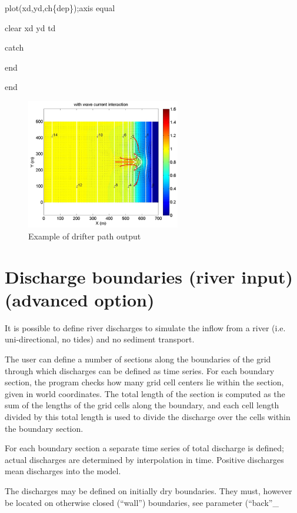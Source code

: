 plot(xd,yd,ch\{dep\});axis equal

clear xd yd td

catch

end

end

\begin{figure}[h]
  \centering
  \includegraphics[width=0.6\textwidth]{image21}
  \caption{Example of drifter path output}
  \label{fig:image21}
\end{figure}

\section{ Discharge boundaries (river input) (advanced option)}

It is possible to define river discharges to simulate the inflow from a river (i.e. uni-directional, no tides) and no sediment transport. 

The user can define a number of sections along the boundaries of the grid through which discharges can be defined as time series. For each boundary section, the program checks how many grid cell centers lie within the section, given in world coordinates. The total length of the section is computed as the sum of the lengths of the grid cells along the boundary, and each cell length divided by this total length is used to divide the discharge over the cells within the boundary section.  

For each boundary section a separate time series of total discharge is defined; actual discharges are determined by interpolation in time. Positive discharges mean discharges into the model.

The discharges may be defined on initially dry boundaries. They must, however be located on otherwise closed (``wall'') boundaries, see parameter (``back''\_

